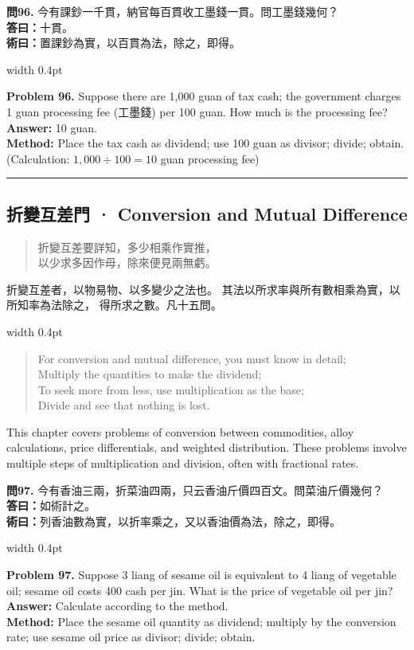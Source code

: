 \documentclass[10pt,a4paper]{article}
\newcommand{\longline}{\noindent\rule{\textwidth}{0.3pt}}
\newlength{\cnwidth}
\newlength{\enwidth}
\newcommand{\bilingual}[2]{%
  \noindent%
  \begin{minipage}[t]{\cnwidth}%
    #1%
  \end{minipage}%
  \hfill\vrule width 0.4pt\hfill%
  \begin{minipage}[t]{\enwidth}%
    #2%
  \end{minipage}%
  \par\smallskip%
}
\newcommand{\bilingualsubsection}[2]{%
  \subsection*{#1 · #2}
}
\newenvironment{rhymecn}{%
  \begin{quote}\itshape\color{verselinecolor}
}{\end{quote}}
\begin{document}
\bilingual{%
  \textbf{問96.}
  今有課鈔一千貫，納官每百貫收工墨錢一貫。問工墨錢幾何？\\
  \textbf{答曰：}十貫。\\
  \textbf{術曰：}置課鈔為實，以百貫為法，除之，即得。
}{%
  \textbf{Problem 96.}
  Suppose there are 1,000 guan of tax cash; the government charges 1 guan
  processing fee (工墨錢) per 100 guan. How much is the processing fee?\\
  \textbf{Answer:} 10 guan.\\
  \textbf{Method:} Place the tax cash as dividend; use 100 guan as divisor;
  divide; obtain.\\
  (Calculation: $1{,}000 \div 100 = 10$ guan processing fee)
}

\longline


\bilingualsubsection{折變互差門}{Conversion and Mutual Difference}
\label{sec:zhebian}

\bilingual{%
  \begin{rhymecn}
  折變互差要詳知，多少相乘作實推，\\
  以少求多因作母，除來便見兩無虧。
  \end{rhymecn}
  折變互差者，以物易物、以多變少之法也。
  其法以所求率與所有數相乘為實，以所知率為法除之，
  得所求之數。凡十五問。
}{%
  \begin{rhymecn}
  For conversion and mutual difference, you must know in detail;\\
  Multiply the quantities to make the dividend;\\
  To seek more from less, use multiplication as the base;\\
  Divide and see that nothing is lost.
  \end{rhymecn}
  This chapter covers problems of conversion between commodities,
  alloy calculations, price differentials, and weighted distribution.
  These problems involve multiple steps of multiplication and division,
  often with fractional rates.
}

\bilingual{%
  \textbf{問97.}
  今有香油三兩，折菜油四兩，只云香油斤價四百文。問菜油斤價幾何？\\
  \textbf{答曰：}如術計之。\\
  \textbf{術曰：}列香油數為實，以折率乘之，又以香油價為法，除之，即得。
}{%
  \textbf{Problem 97.}
  Suppose 3 liang of sesame oil is equivalent to 4 liang of vegetable oil;
  sesame oil costs 400 cash per jin. What is the price of vegetable oil per jin?\\
  \textbf{Answer:} Calculate according to the method.\\
  \textbf{Method:} Place the sesame oil quantity as dividend; multiply by the
  conversion rate; use sesame oil price as divisor; divide; obtain.
}
\end{document}
